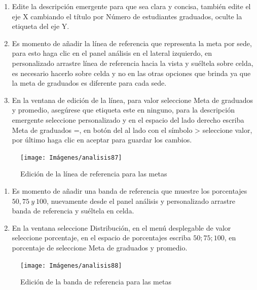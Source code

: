 \documentclass[
]{book}
\begin{document}
\begin{enumerate}
\def\labelenumi{\arabic{enumi}.}
\setcounter{enumi}{3}
\item
  Edite la descripción emergente para que sea clara y concisa, también edite el eje X cambiando el título por Número de estudiantes graduados, oculte la etiqueta del eje Y.
\item
  Es momento de añadir la línea de referencia que representa la meta por sede, para esto haga clic en el panel análisis en el lateral izquierdo, en personalizado arrastre línea de referencia hacia la vista y suéltela sobre celda, es necesario hacerlo sobre celda y no en las otras opciones que brinda ya que la meta de graduados es diferente para cada sede.
\item
  En la ventana de edición de la línea, para valor seleccione Meta de graduados y promedio, asegúrese que etiqueta este en ninguno, para la descripción emergente seleccione personalizado y en el espacio del lado derecho escriba Meta de graduados =, en botón del al lado con el símbolo \textgreater{} seleccione valor, por último haga clic en aceptar para guardar los cambios.
\end{enumerate}

\begin{figure}

{\centering \texttt{[image: Imágenes/analisis87]} 

}

\caption{Edición de la línea de referencia para las metas}\label{fig:paso6graficobala-fig}
\end{figure}

\begin{enumerate}
\def\labelenumi{\arabic{enumi}.}
\setcounter{enumi}{6}
\item
  Es momento de añadir una banda de referencia que muestre los porcentajes \(50, 75 ~ y ~100\), nuevamente desde el panel análisis y personalizado arrastre banda de referencia y suéltela en celda.
\item
  En la ventana seleccione Distribución, en el menú desplegable de valor seleccione porcentaje, en el espacio de porcentajes escriba \(50;75;100\), en porcentaje de seleccione Meta de graduados y promedio.
\end{enumerate}

\begin{figure}

{\centering \texttt{[image: Imágenes/analisis88]} 

}

\caption{Edición de la banda de referencia para las metas}\label{fig:paso8graficobala-fig}
\end{figure}
\end{document}
